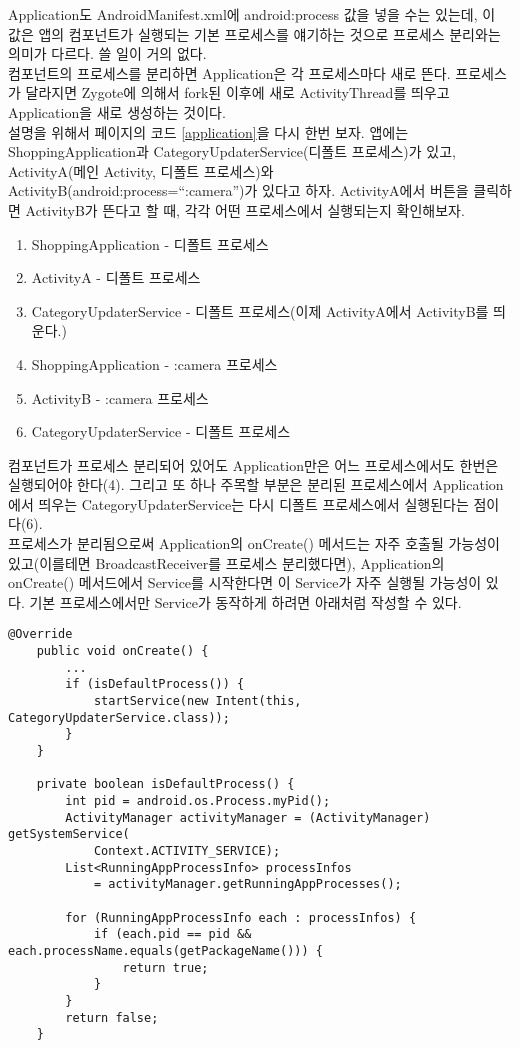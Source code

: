 Application도 AndroidManifest.xml에 android:process 값을 넣을 수는 있는데, 이 값은 앱의 컴포넌트가 실행되는 기본 프로세스를 얘기하는 것으로 프로세스 분리와는 의미가 다르다. 쓸 일이 거의 없다.\\

컴포넌트의 프로세스를 분리하면 Application은 각 프로세스마다 새로 뜬다. 프로세스가 달라지면 Zygote에 의해서 fork된 이후에 새로 ActivityThread를 띄우고 Application을 새로 생성하는 것이다.\\

설명을 위해서 \pageref{application} 페이지의 코드 \ref{application}을 다시 한번 보자. 
앱에는 ShoppingApplication과 CategoryUpdaterService(디폴트 프로세스)가 있고, ActivityA(메인 Activity, 디폴트 프로세스)와 Activity\-B(and\-roid:process=``:ca\-mera'')가 있다고 하자. 
ActivityA에서 버튼을 클릭하면 ActivityB가 뜬다고 할 때, 각각 어떤 프로세스에서 실행되는지 확인해보자.

\begin{enumerate}
\item ShoppingApplication - 디폴트 프로세스
\item ActivityA - 디폴트 프로세스
\item CategoryUpdaterService - 디폴트 프로세스(이제 ActivityA에서 ActivityB를 띄운다.)
\item ShoppingApplication - :camera 프로세스
\item ActivityB - :camera 프로세스
\item CategoryUpdaterService - 디폴트 프로세스
\end{enumerate}

컴포넌트가 프로세스 분리되어 있어도 Application만은 어느 프로세스에서도 한번은 실행되어야 한다(4).
그리고 또 하나 주목할 부분은 분리된 프로세스에서 Application에서 띄우는 CategoryUpdaterService는 다시 디폴트 프로세스에서 실행된다는 점이다(6).\\

프로세스가 분리됨으로써 Application의 onCreate() 메서드는 자주 호출될 가능성이 있고(이를테면 BroadcastReceiver를 프로세스 분리했다면), Application의 onCreate() 메서드에서 Service를 시작한다면 이 Service가 자주 실행될 가능성이 있다.
기본 프로세스에서만 Service가 동작하게 하려면 아래처럼 작성할 수 있다.

\begin{lstlisting}[frame=single] 
	@Override
	public void onCreate() {
		...
		if (isDefaultProcess()) {
			startService(new Intent(this, CategoryUpdaterService.class));
		}
	}
	
	private boolean isDefaultProcess() {
		int pid = android.os.Process.myPid();
        ActivityManager activityManager = (ActivityManager) getSystemService(
        	Context.ACTIVITY_SERVICE);                      
        List<RunningAppProcessInfo> processInfos 
        	= activityManager.getRunningAppProcesses();     

        for (RunningAppProcessInfo each : processInfos) {                          
            if (each.pid == pid && each.processName.equals(getPackageName())) {                              
                return true;
            }                         
        }
        return false;
    }
\end{lstlisting}


